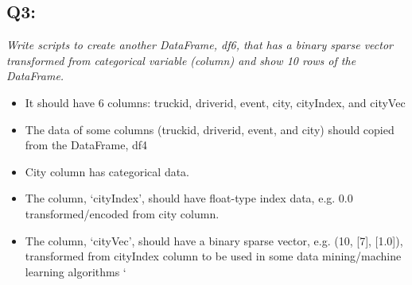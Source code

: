 \documentclass[]{article}
\begin{document}
\subsection*{Q3: }
\emph{Write scripts to create another DataFrame, df6, 
	that has a binary sparse vector transformed from 
	categorical variable (column) and show 10 rows of the DataFrame.} \\
	\begin{itemize}[before=\itshape,font=\normalfont]
		\item It should have 6 columns: truckid, driverid, event, city, cityIndex, and cityVec
		\item The data of some columns (truckid, driverid, event, and city) should copied from the DataFrame, df4
		\item City column has categorical data.
		\item The column, ‘cityIndex’, should have float-type index data, e.g. 0.0 transformed/encoded from city column.
		\item The column, ‘cityVec’, should have a binary sparse vector, e.g. (10, [7], [1.0]), transformed from cityIndex column to be used in some data mining/machine learning algorithms
`	\end{itemize} 


\begin{verbatim}
\end{verbatim}
\end{document}
